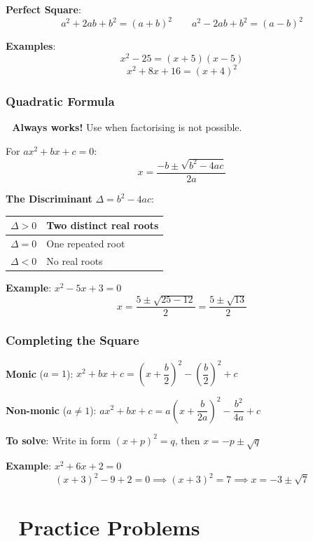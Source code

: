 \documentclass[
  letterpaper,
  DIV=11,
  numbers=noendperiod]{scrreprt}
\theoremstyle{definition}
\theoremstyle{remark}
\begin{document}
\textbf{Perfect Square}:
\[a^2 + 2ab + b^2 = (a+b)^2 \qquad a^2 - 2ab + b^2 = (a-b)^2\]

\textbf{Examples}: \[x^2 - 25 = (x+5)(x-5)\] \[x^2 + 8x + 16 = (x+4)^2\]

\subsubsection*{Quadratic Formula}\label{quadratic-formula}

\textbf{📝 Always works!} Use when factorising is not possible.

For \(ax^2 + bx + c = 0\): \[x = \dfrac{-b \pm \sqrt{b^2 - 4ac}}{2a}\]

\textbf{The Discriminant} \(\Delta = b^2 - 4ac\):

\begin{longtable}[]{@{}ll@{}}
\toprule\noalign{}
\(\Delta > 0\) & Two distinct real roots \\
\midrule\noalign{}
\endhead
\bottomrule\noalign{}
\endlastfoot
\(\Delta = 0\) & One repeated root \\
\(\Delta < 0\) & No real roots \\
\end{longtable}

\textbf{Example}: \(x^2 - 5x + 3 = 0\)
\[x = \dfrac{5 \pm \sqrt{25-12}}{2} = \dfrac{5 \pm \sqrt{13}}{2}\]

\subsubsection*{Completing the Square}\label{completing-the-square}

\textbf{Monic} (\(a = 1\)):
\(x^2 + bx + c = \left(x + \dfrac{b}{2}\right)^2 - \left(\dfrac{b}{2}\right)^2 + c\)

\textbf{Non-monic} (\(a \neq 1\)):
\(ax^2 + bx + c = a\left(x + \dfrac{b}{2a}\right)^2 - \dfrac{b^2}{4a} + c\)

\textbf{To solve}: Write in form \((x+p)^2 = q\), then
\(x = -p \pm \sqrt{q}\)

\textbf{Example}: \(x^2 + 6x + 2 = 0\)
\[( x+3)^2 - 9 + 2 = 0 \implies (x+3)^2 = 7 \implies x = -3 \pm \sqrt{7}\]

\section{📝 Practice Problems}\label{practice-problems-3}
\end{document}
